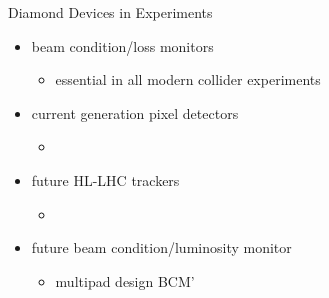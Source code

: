 \begin{frame}{Diamond Devices in Experiments}

	\begin{itemize}
		\itemfill
		\item beam condition/loss monitors
		\begin{itemize}
			\item essential in all modern collider experiments
		\end{itemize}
		\item current generation pixel detectors
		\begin{itemize}
			\item {}
		\end{itemize}
		\item future HL-LHC trackers
		\begin{itemize}
			\item {}
		\end{itemize}
		\item future beam condition/luminosity monitor
		\begin{itemize}
			\item multipad design BCM'
		\end{itemize}
	\end{itemize}\vspace*{10pt}
		
\end{frame}

